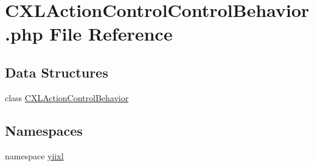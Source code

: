 \hypertarget{CXLActionControlControlBehavior_8php}{
\section{CXLActionControlControlBehavior.php File Reference}
\label{CXLActionControlControlBehavior_8php}
}
\subsection*{Data Structures}
\begin{DoxyCompactItemize}
\item 
class \hyperlink{classCXLActionControlBehavior}{CXLActionControlBehavior}
\end{DoxyCompactItemize}
\subsection*{Namespaces}
\begin{DoxyCompactItemize}
\item 
namespace \hyperlink{namespaceyiixl}{yiixl}
\end{DoxyCompactItemize}
